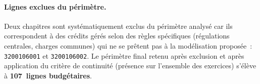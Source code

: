 \paragraph{Lignes exclues du p\'erim\`etre.}
Deux chapitres sont syst\'ematiquement exclus du p\'erim\`etre
analys\'e car ils correspondent \`a des cr\'edits g\'er\'es selon des
r\`egles sp\'ecifiques (r\'egulations centrales, charges communes)
qui ne se pr\^etent pas \`a la mod\'elisation propos\'ee~:
\texttt{3200106001} et \texttt{3200106002}. Le p\'erim\`etre final
retenu apr\`es exclusion et apr\`es application du crit\`ere de
continuit\'e (pr\'esence sur l'ensemble des exercices) s'\'el\`eve \`a
\textbf{107~lignes budg\'etaires}.

